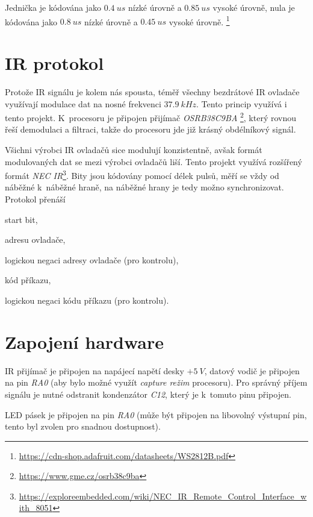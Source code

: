 \documentclass[12pt,a4paper]{article}
\begin{document}
Jednička je kódována jako $0.4\ us$ nízké úrovně a $0.85\ us$ vysoké úrovně,
nula je kódována jako $0.8\ us$ nízké úrovně a $0.45\ us$ vysoké úrovně.
\footnote{\url{https://cdn-shop.adafruit.com/datasheets/WS2812B.pdf}}

\section{IR protokol}

Protože IR signálu je kolem nás spousta, téměř všechny bezdrátové IR ovladače
využívají modulace dat na nosné frekvenci $37.9\ kHz$. Tento princip využívá
i tento projekt. K~procesoru je připojen přijímač \textit{OSRB38C9BA}
\footnote{\url{https://www.gme.cz/osrb38c9ba}}, který rovnou řeší demodulaci
a filtraci, takže do procesoru jde již krásný obdélníkový signál.

Všichni výrobci IR ovladačů sice modulují konzistentně, avšak formát modulovaných
dat se mezi výrobci ovladačů liší. Tento projekt využívá rozšířený formát
\textit{NEC IR}\footnote{\url{https://exploreembedded.com/wiki/NEC_IR_Remote_Control_Interface_with_8051}}.
Bity jsou kódovány pomocí délek pulsů, měří se vždy od náběžné k~náběžné hraně,
na náběžné hrany je tedy možno synchronizovat. Protokol přenáší

\begin{compactenum}
\item start bit,
\item adresu ovladače,
\item logickou negaci adresy ovladače (pro kontrolu),
\item kód příkazu,
\item logickou negaci kódu příkazu (pro kontrolu).
\end{compactenum}

\section{Zapojení hardware}

IR přijímač je připojen na napájecí napětí desky $+5\ V$, datový vodič je
připojen na pin \textit{RA0} (aby bylo možné využít \textit{capture režim}
procesoru).  Pro správný příjem signálu je nutné odstranit kondenzátor
\textit{C12}, který je k~tomuto pinu připojen.

LED pásek je připojen na pin \textit{RA0} (může být připojen na libovolný
výstupní pin, tento byl zvolen pro snadnou dostupnost).
\end{document}
